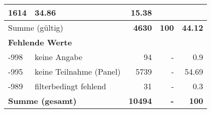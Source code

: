 \begin{longtable}{lXrrr}
       \num{1614} &
       \num[round-mode=places,round-precision=2]{34,86} &
         \num[round-mode=places,round-precision=2]{15,38} \\
     \midrule
     \multicolumn{2}{l}{Summe (gültig)} &
       \textbf{\num{4630}} &
     \textbf{100} &
       \textbf{\num[round-mode=places,round-precision=2]{44,12}} \\
     \multicolumn{5}{l}{\textbf{Fehlende Werte}}\\
       -998 &
       keine Angabe &
         \num{94} &
        - &
         \num[round-mode=places,round-precision=2]{0,9} \\
       -995 &
       keine Teilnahme (Panel) &
         \num{5739} &
        - &
         \num[round-mode=places,round-precision=2]{54,69} \\
       -989 &
       filterbedingt fehlend &
         \num{31} &
        - &
         \num[round-mode=places,round-precision=2]{0,3} \\
     \midrule
     \multicolumn{2}{l}{\textbf{Summe (gesamt)}} &
          \textbf{\num{10494}} &
        \textbf{-} &
        \textbf{100} \\
     \bottomrule
     \end{longtable}
     
